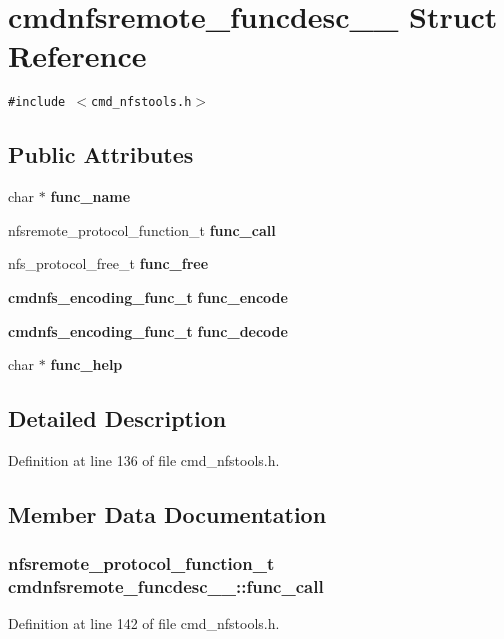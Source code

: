 \section{cmdnfsremote\_\-funcdesc\_\-\_\- Struct Reference}
\label{structcmdnfsremote__funcdesc____}
{\tt \#include $<$cmd\_\-nfstools.h$>$}

\subsection*{Public Attributes}
\begin{CompactItemize}
\item 
char $\ast$ {\bf func\_\-name}
\item 
nfsremote\_\-protocol\_\-function\_\-t {\bf func\_\-call}
\item 
nfs\_\-protocol\_\-free\_\-t {\bf func\_\-free}
\item 
{\bf cmdnfs\_\-encoding\_\-func\_\-t} {\bf func\_\-encode}
\item 
{\bf cmdnfs\_\-encoding\_\-func\_\-t} {\bf func\_\-decode}
\item 
char $\ast$ {\bf func\_\-help}
\end{CompactItemize}


\subsection{Detailed Description}


Definition at line 136 of file cmd\_\-nfstools.h.

\subsection{Member Data Documentation}
\subsubsection[{func\_\-call}]{\setlength{\rightskip}{0pt plus 5cm}nfsremote\_\-protocol\_\-function\_\-t {\bf cmdnfsremote\_\-funcdesc\_\-\_\-::func\_\-call}}\label{structcmdnfsremote__funcdesc_____b9c6cb6f4516f3899623a123a419668f}




Definition at line 142 of file cmd\_\-nfstools.h.
